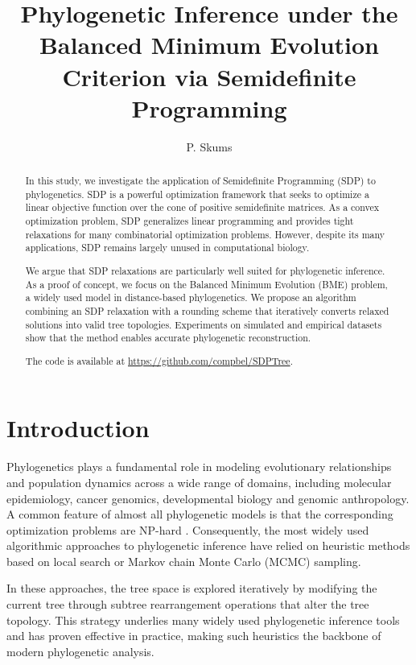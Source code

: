 \documentclass{article}
\title{Phylogenetic Inference under the Balanced Minimum Evolution Criterion via Semidefinite Programming}
\author[1,$\dagger$]{P. Skums}
\affil[1]{School of Computing, University of Connecticut, Storrs, CT, USA}
\affil[$\dagger$]{Email: pavel.skums@uconn.edu}
\date{}
\begin{document}
\maketitle

\begin{abstract}
In this study, we investigate the application of Semidefinite Programming (SDP) to phylogenetics. SDP is a powerful optimization framework that seeks to optimize a linear objective function over the cone of positive semidefinite matrices. As a convex optimization problem, SDP generalizes linear programming and provides tight relaxations for many combinatorial optimization problems. However, despite its many applications, SDP remains largely unused in computational biology.

We argue that SDP relaxations are particularly well suited for phylogenetic inference. As a proof of concept, we focus on the Balanced Minimum Evolution (BME) problem, a widely used model in distance-based phylogenetics. We propose an algorithm combining an SDP relaxation with a rounding scheme that iteratively converts relaxed solutions into valid tree topologies. Experiments on simulated and empirical datasets show that the method enables accurate phylogenetic reconstruction.

The code is available at \url{https://github.com/compbel/SDPTree}.
\end{abstract}

\section{Introduction}

Phylogenetics plays a fundamental role in modeling evolutionary relationships and population dynamics across a wide range of domains, including molecular epidemiology, cancer genomics, developmental biology and genomic anthropology. A common feature of almost all phylogenetic models is that the corresponding optimization problems are NP-hard \cite{day1987computational,chor2005maximum}. Consequently, the most widely used algorithmic approaches to phylogenetic inference have relied on heuristic methods based on local search or Markov chain Monte Carlo (MCMC) sampling. 

In these approaches, the tree space is explored iteratively by modifying the current tree through subtree rearrangement operations that alter the tree topology. This strategy underlies many widely used phylogenetic
inference tools and has proven effective in practice, making such heuristics the backbone of modern
phylogenetic analysis.
\end{document}
